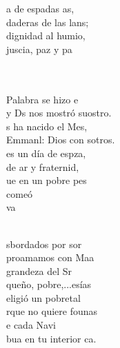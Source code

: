 \documentclass[12pt]{article}
\begin{document}
\begin{multicols*}{2}
\begin{cancion}
	a de espadas as,\\
	daderas de las lans;\\
	 dignidad al humio,\\
	juscia, paz y pa\\\jump\\
	\begin{chorus}%
	    \\
	 Palabra se hizo e\\
	y Ds nos mostró suostro.\\
	s ha nacido el Mes,\\
	Emmanl: Dios con sotros.\\
	es un día de espza,\\
	de ar y fraternid,\\
	ue en un pobre pes\\
	comeó   \\
	 va   \\
	\end{chorus}%
	\jump\\
\jump
	sbordados por sor\\
	proamamos con Maa \\
	 grandeza del Sr\\
	queño, pobre,...esías\\
	eligió un pobretal\\
	rque no quiere founas\\
	e cada Navi\\
	bua en tu interior  ca.\\\jump\\

\end{cancion}
\end{multicols*}
\end{document}
